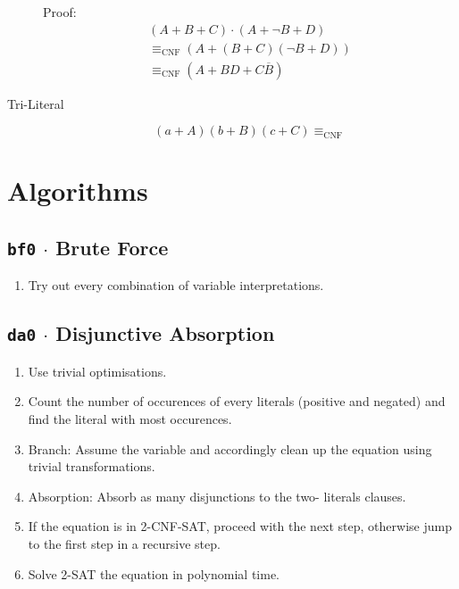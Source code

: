 \documentclass[12pt, letterpaper]{article}
\begin{document}
\begin{description}
        Proof: \begin{equation}\nonumber\begin{split}
            (A + B + C) \cdot (A + \lnot B + D) \\
            \equiv_\text{CNF} (A + (B + C)(\lnot B + D)) \\
            \equiv_\text{CNF} (A + BD + C \overline B)
        \end{split}\end{equation}

        \item[Tri-Literal]
        
        \[ (a+A)(b+B)(c+C) \equiv_\text{CNF} \]

    \end{description}

    \section*{Algorithms}

    \subsection*{\texttt{bf0} $\cdot$ Brute Force}

    \begin{enumerate}
        \item Try out every combination of variable interpretations.
    \end{enumerate}

    \subsection*{\texttt{da0} $\cdot$ Disjunctive Absorption}

    \begin{enumerate}
        \item Use trivial optimisations.

        \item Count the number of occurences of every literals
        (positive and negated) and find the literal with most
        occurences.

        \item Branch: Assume the variable and accordingly clean
        up the equation using trivial transformations.

        \item Absorption: Absorb as many disjunctions to the two-
        literals clauses.

        \item If the equation is in 2-CNF-SAT, proceed with the
        next step, otherwise jump to the first step in a recursive
        step.

        \item Solve 2-SAT the equation in polynomial time.
    \end{enumerate}
\end{document}
